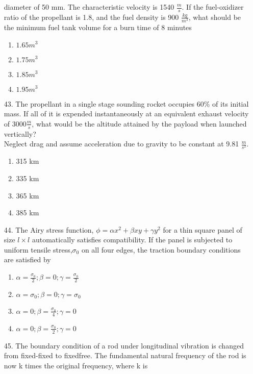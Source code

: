 \documentclass[journal]{IEEEtran}
\begin{document}
\begin{enumerate}
    diameter of 50 mm. The characteristic velocity is 1540 $\frac{m}{s}$. If the fuel-oxidizer ratio of the
    propellant is 1.8, and the fuel density is 900 $\frac{kg}{m^3}$, what should be the minimum fuel tank volume
    for a burn time of 8 minutes
    \begin{enumerate}[label=(\Alph*)]
        \item $1.65m^3$
        \item $1.75m^3$
        \item $1.85m^3$
        \item $1.95m^3$
    \end{enumerate}
    \item[43.] The propellant in a single stage sounding rocket occupies 60\% of its initial mass. If all of it is
    expended instantaneously at an equivalent exhaust velocity of $3000\frac{m}{s}$, what would be the altitude
    attained by the payload when launched vertically?\\
    Neglect drag and assume acceleration due to gravity to be constant at 9.81 $\frac{m}{s^2}$.
    \begin{enumerate}[label=(\Alph*)]
        \item 315 km
        \item 335 km
        \item 365 km
        \item 385 km
    \end{enumerate}
    \item[44.] The Airy stress function, $\phi = \alpha x^2 + \beta xy + \gamma y^2$ for a thin square panel of size $l\times l$ automatically
    satisfies compatibility. If the panel is subjected to uniform tensile stress,$\sigma _0$ on all four edges, the
    traction boundary conditions are satisfied by
    \begin{enumerate}[label=(\Alph*)]
        \item $\alpha = \frac{\sigma_0}{2};\beta = 0;\gamma = \frac{\sigma_0}{2}$
        \item $\alpha = \sigma_0;\beta = 0;\gamma = \sigma_0$
        \item $\alpha = 0;\beta = \frac{\sigma_0}{4};\gamma = 0$
        \item $\alpha = 0;\beta = \frac{\sigma_0}{2};\gamma = 0$
    \end{enumerate}
    \item[45.] The boundary condition of a rod under longitudinal vibration is changed from fixed-fixed to fixedfree. The fundamental natural frequency of the rod is now k times the original frequency, where k is 

\end{enumerate}
\end{document}
